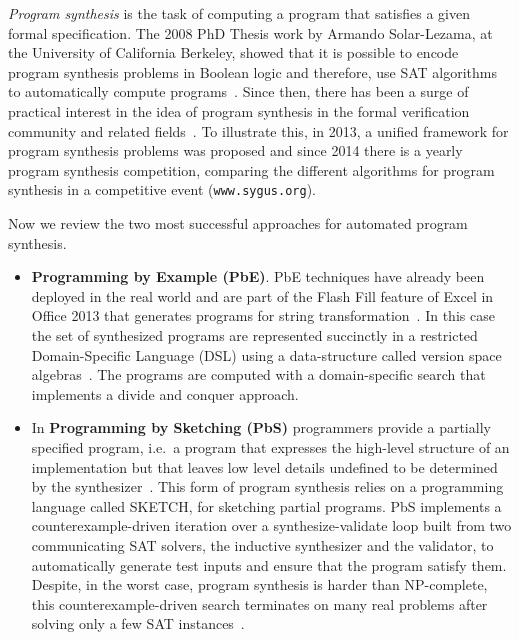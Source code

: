 \documentclass[10pt,a4paper]{paper}
\begin{document}
{\em Program synthesis} is the task of computing a program that satisfies a given formal specification. The 2008 PhD Thesis work by Armando Solar-Lezama, at the University of California Berkeley, showed that it is possible to encode program synthesis problems in Boolean logic and therefore, use SAT algorithms to automatically compute programs~\cite{lezama2008program}. Since then, there has been a surge of practical interest in the idea of program synthesis in the formal verification community and related fields~\cite{alur2013syntax}. To illustrate this, in 2013, a unified framework for program synthesis problems was proposed and since 2014 there is a yearly program synthesis competition, comparing the different algorithms for program synthesis in a competitive event ({\tt www.sygus.org}).

Now we review the two most successful approaches for automated program synthesis. 
\begin{itemize}
\item{\bf Programming by Example (PbE)}. PbE techniques have already been deployed in the real world and are part of the {\sc Flash Fill} feature of Excel in Office 2013 that generates programs for string transformation~\cite{gulwani2011automating}. In this case the set of synthesized programs are represented succinctly in a restricted Domain-Specific Language (DSL) using a data-structure called version space algebras~\cite{mitchell1982generalization}. The programs are computed with a domain-specific search that implements a divide and conquer approach. 

\item In {\bf Programming by Sketching (PbS)} programmers provide a partially specified program, i.e.~a program that expresses the high-level structure of an implementation but that leaves low level details undefined to be determined by the synthesizer~\cite{solar2006combinatorial}. This form of program synthesis relies on a programming language called {\sc SKETCH}, for sketching partial programs. PbS implements a counterexample-driven iteration over a synthesize-validate loop built from two communicating SAT solvers, the inductive synthesizer and the validator, to automatically generate test inputs and ensure that the program satisfy them. Despite, in the worst case, program synthesis is harder than NP-complete, this counterexample-driven search terminates on many real problems after solving only a few SAT instances~\cite{lake2015human}.
\end{itemize}
\end{document}
